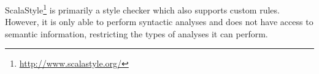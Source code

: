 ScalaStyle\footnote{\url{http://www.scalastyle.org/}} is primarily a style checker which also supports custom rules.
However, it is only able to perform syntactic analyses and does not have access to semantic information, restricting the types of analyses it can perform.


